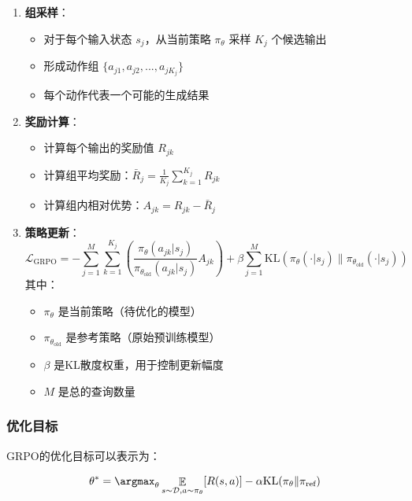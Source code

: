 \documentclass[a4paper, 12pt]{article}
\DeclareMathOperator*{\E}{\mathbb{E}}    %
\begin{document}
\begin{enumerate}
    \item \textbf{组采样}：
        \begin{itemize}
            \item 对于每个输入状态 $s_j$，从当前策略 $\pi_\theta$ 采样 $K_j$ 个候选输出
            \item 形成动作组 $\{a_{j1}, a_{j2}, ..., a_{jK_j}\}$
            \item 每个动作代表一个可能的生成结果
        \end{itemize}
    
    \item \textbf{奖励计算}：
        \begin{itemize}
            \item 计算每个输出的奖励值 $R_{jk}$
            \item 计算组平均奖励：$\bar{R}_j = \frac{1}{K_j}\sum_{k=1}^{K_j} R_{jk}$
            \item 计算组内相对优势：$A_{jk} = R_{jk} - \bar{R}_j$
        \end{itemize}
    
    \item \textbf{策略更新}：
        \begin{equation}
            \mathcal{L}_{\text{GRPO}} = -\sum_{j=1}^M \sum_{k=1}^{K_j} \left(\frac{\pi_{\theta}(a_{jk}|s_j)}{\pi_{\theta_{\text{old}}}(a_{jk}|s_j)} A_{jk}\right) + \beta \sum_{j=1}^M \text{KL}(\pi_\theta(\cdot|s_j) \| \pi_{\theta_{\text{old}}}(\cdot|s_j))
        \end{equation}
        其中：
        \begin{itemize}
            \item $\pi_\theta$ 是当前策略（待优化的模型）
            \item $\pi_{\theta_{\text{old}}}$ 是参考策略（原始预训练模型）
            \item $\beta$ 是KL散度权重，用于控制更新幅度
            \item $M$ 是总的查询数量
        \end{itemize}
\end{enumerate}

\subsubsection{优化目标}
GRPO的优化目标可以表示为：

\begin{equation}
    \theta^* = \argmax_\theta \E_{s \sim \mathcal{D}, a \sim \pi_\theta}[R(s,a)] - \alpha \text{KL}(\pi_\theta \| \pi_{\text{ref}})
\end{equation}
\end{document}
